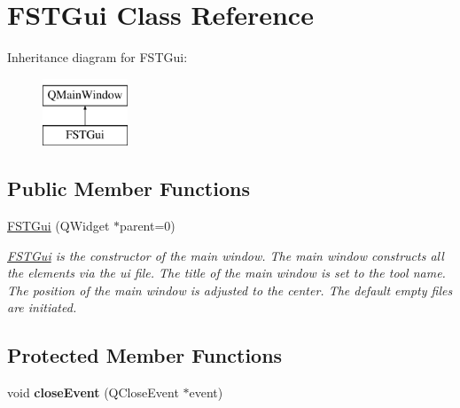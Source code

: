 \hypertarget{classFSTGui}{\section{F\-S\-T\-Gui Class Reference}
\label{classFSTGui}
}
Inheritance diagram for F\-S\-T\-Gui\-:\begin{figure}[H]
\begin{center}
\leavevmode
\includegraphics[height=2.000000cm]{classFSTGui}
\end{center}
\end{figure}
\subsection*{Public Member Functions}
\begin{DoxyCompactItemize}
\item 
\hyperlink{classFSTGui_a9d3e93afab91edceb3bded55cb7a74fe}{F\-S\-T\-Gui} (Q\-Widget $\ast$parent=0)
\begin{DoxyCompactList}\small\item\em \hyperlink{classFSTGui}{F\-S\-T\-Gui} is the constructor of the main window. The main window constructs all the elements via the ui file. The title of the main window is set to the tool name. The position of the main window is adjusted to the center. The default empty files are initiated. \end{DoxyCompactList}\end{DoxyCompactItemize}
\subsection*{Protected Member Functions}
\begin{DoxyCompactItemize}
\item 
\hypertarget{classFSTGui_a353c1785f58a84918f5fb6f0537ea174}{void {\bfseries close\-Event} (Q\-Close\-Event $\ast$event)}\label{classFSTGui_a353c1785f58a84918f5fb6f0537ea174}

\end{DoxyCompactItemize}



